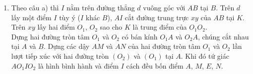 \begin{vd}
{\begin{enumerate}
Vì $B$ là trung điểm của $AE$ nên $IA=IE$. Ta lại có $IA=IM=IN$ (vì $O_1I$, $O_2I$ lần lượt là đường trung trực của $AM$, $AN$). Vậy điểm $I$ các đều bốn điểm $A$, $M$, $E$, $N$ nên bốn điểm này cùng thuộc đường tròn tâm $I$.
\item Theo câu a) thì $I$ nằm trên đường thẳng $d$ vuông góc với $AB$ tại $B$. Trên $d$ lấy một điểm $I$ tùy ý ($I$ khác $B$), $AI$ cắt đường trung trực $xy$ của $AB$ tại $K$. Trên $xy$ lấy hai điểm $O_1$, $O_2$ sao cho $K$ là trung điểm của $O_1O_2$.\\
Dựng hai đường tròn tâm $O_1$ và $O_2$ có bán kính $O_1A$ và $O_2A$, chúng cắt nhau tại $A$ và $B$. Dựng các dậy $AM$ và $AN$ của hai đường tròn tâm $O_1$ và $O_2$ lần lượt tiếp xúc với hai đường tròn $(O_2)$ và $(O_1)$ tại $A$. Khi đó tứ giác $AO_1IO_2$ là hình bình hành và điểm $I$ cách đều bốn điểm $A$, $M$, $E$, $N$.
\end{enumerate}
}
\end{vd}

